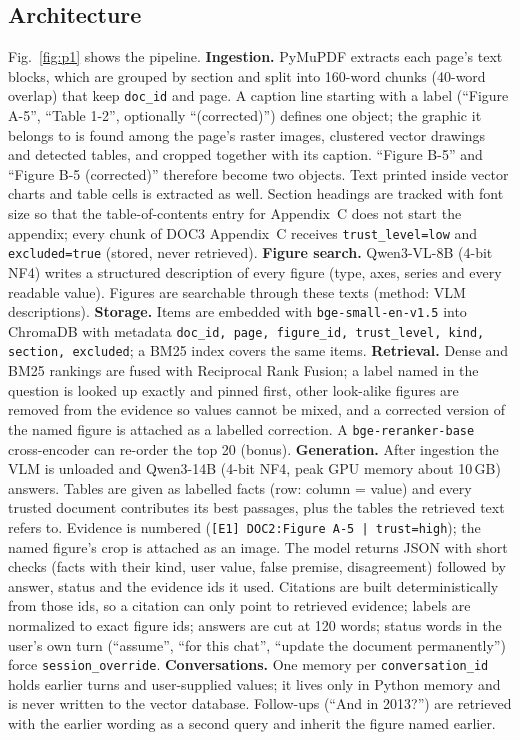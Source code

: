 \documentclass[conference]{IEEEtran}
\begin{document}
\subsection{Architecture}
Fig.~\ref{fig:p1} shows the pipeline. \textbf{Ingestion.} PyMuPDF extracts each page's text blocks, which are grouped
by section and split into 160-word chunks (40-word overlap) that keep \texttt{doc\_id} and page. A caption line
starting with a label (``Figure A-5'', ``Table 1-2'', optionally ``(corrected)'') defines one object; the graphic it
belongs to is found among the page's raster images, clustered vector drawings and detected tables, and cropped
together with its caption. ``Figure B-5'' and ``Figure B-5 (corrected)'' therefore become two objects. Text printed
inside vector charts and table cells is extracted as well. Section headings are tracked with font size so that the
table-of-contents entry for Appendix~C does not start the appendix; every chunk of DOC3 Appendix~C receives
\texttt{trust\_level=low} and \texttt{excluded=true} (stored, never retrieved).
\textbf{Figure search.} Qwen3-VL-8B (4-bit NF4) writes a structured description of every figure (type, axes, series and every
readable value). Figures are searchable through these texts (method: VLM descriptions).
\textbf{Storage.} Items are embedded with \texttt{bge-small-en-v1.5} into ChromaDB with metadata \texttt{doc\_id, page,
figure\_id, trust\_level, kind, section, excluded}; a BM25 index covers the same items.
\textbf{Retrieval.} Dense and BM25 rankings are fused with Reciprocal Rank Fusion; a label named in the question is
looked up exactly and pinned first, other look-alike figures are removed from the evidence so values cannot be mixed,
and a corrected version of the named figure is attached as a labelled correction. A \texttt{bge-reranker-base}
cross-encoder can re-order the top 20 (bonus).
\textbf{Generation.} After ingestion the VLM is unloaded and Qwen3-14B (4-bit NF4, peak GPU memory about 10\,GB) answers. Tables are given as labelled facts (row: column = value) and every trusted document contributes its best passages, plus the tables the retrieved text refers to. Evidence is numbered (\texttt{[E1] DOC2:Figure A-5 | trust=high}); the named figure's crop is
attached as an image. The model returns JSON with short checks (facts with their kind, user value, false premise,
disagreement) followed by answer, status and the evidence ids it used. Citations are built deterministically from
those ids, so a citation can only point to retrieved evidence; labels are normalized to exact figure ids; answers are
cut at 120 words; status words in the user's own turn (``assume'', ``for this chat'', ``update the document
permanently'') force \texttt{session\_override}.
\textbf{Conversations.} One memory per \texttt{conversation\_id} holds earlier turns and user-supplied values; it
lives only in Python memory and is never written to the vector database. Follow-ups (``And in 2013?'') are retrieved
with the earlier wording as a second query and inherit the figure named earlier.
\end{document}
